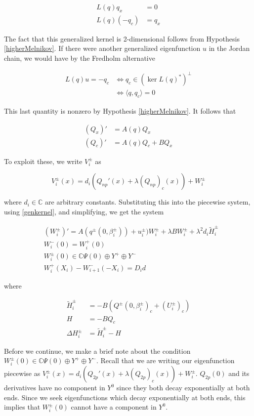 \documentclass[12pt]{article}
\def\C{{\mathbb C}}
\begin{document}
\begin{align}\label{genkernel}
L(q)q_x &= 0 \nonumber \\
L(q)(-q_c) &= q_x
\end{align}

The fact that this generalized kernel is 2-dimensional follows from Hypothesis \ref{higherMelnikov}. If there were another generalized eigenfunction $u$ in the Jordan chain, we would have by the Fredholm alternative

\begin{align*}
L(q) u = -q_c &\iff q_c \in (\ker L(q)^*)^\perp \\
&\iff \langle q, q_c \rangle = 0 
\end{align*} 

This last quantity is nonzero by Hypothesis \ref{higherMelnikov}. It follows that

\begin{align*}
(Q_x)' &= A(q) Q_x \\
(Q_c)' &= A(q) Q_c + B Q_x
\end{align*}

To exploit these, we write $V_i^\pm$ as 

\begin{equation}
V_i^\pm(x) = d_i (Q_{np}'(x) + \lambda (Q_{np})_c(x)) + W_i^\pm 
\end{equation}

where $d_i \in \C$ are arbitrary constants. Substituting this into the piecewise system, using \eqref{genkernel}, and simplifying, we get the system

\begin{align*}
&(W_i^\pm)' = A( q^\pm(0, \beta_i^\pm) ) + u_i^\pm) W_i^\pm + \lambda B W_i^\pm + \lambda^2 d_i \tilde{H}_i^\pm \\
&W_i^-(0) = W_i^+(0) \\
&W_i^\pm(0) \in \C \Psi(0) \oplus Y^+ \oplus Y^- \\
&W_i^+(X_i) - W_{i+1}^-(-X_i) = D_i d
\end{align*}

where

\begin{align*}
\tilde{H}_i^\pm &= -B( Q^\pm(0, \beta_i^\pm)_c + (U_i^\pm)_c)  \\
H &= -B Q_c \\
\Delta H_i^\pm &= \tilde{H}_i^\pm - H
\end{align*}

Before we continue, we make a brief note about the condition $W_i^\pm(0) \in \C \Psi(0) \oplus Y^+ \oplus Y^-$. Recall that we are writing our eigenfunction piecewise as $V_i^\pm(x) = d_i(Q_{2p}'(x) + \lambda (Q_{2p})_c(x)) + W_i^\pm $. $Q_{2p}(0)$ and its derivatives have no component in $Y^0$ since they both decay exponentially at both ends. Since we seek eigenfunctions which decay exponentially at both ends, this implies that $W_i^\pm(0)$ cannot have a component in $Y^0$.\\
\end{document}
